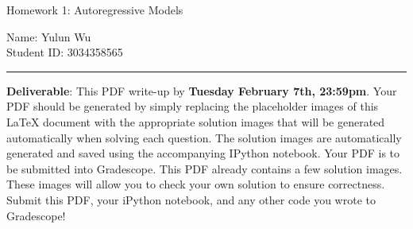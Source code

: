 \documentclass{article}
\newcommand{\ruleskip}{\bigskip\hrule\bigskip}
\begin{document}
\pagestyle{myheadings} 

{\huge
\noindent Homework 1: Autoregressive Models}

\hfill \break
Name: Yulun Wu \\
Student ID: 3034358565
\ruleskip

{\bf Deliverable}: This PDF write-up by {\bf Tuesday February 7th, 23:59pm}.  Your PDF should be generated by simply replacing the placeholder images of this LaTeX document with the appropriate solution images that will be generated automatically when solving each question. The solution images are automatically generated and saved using the accompanying IPython notebook. Your PDF is to be submitted into Gradescope. This PDF already contains a few solution images.  These images will allow you to check your own solution to ensure correctness. Submit this PDF, your iPython notebook, and any other code you wrote to Gradescope!


\vspace{.2in}

\end{document}
